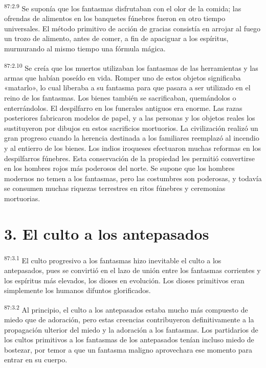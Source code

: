 \par
\textsuperscript{87:2.9} Se suponía que los fantasmas disfrutaban con el olor de la comida; las ofrendas de alimentos en los banquetes fúnebres fueron en otro tiempo universales. El método primitivo de acción de gracias consistía en arrojar al fuego un trozo de alimento, antes de comer, a fin de apaciguar a los espíritus, murmurando al mismo tiempo una fórmula mágica.

\par
\textsuperscript{87:2.10} Se creía que los muertos utilizaban los fantasmas de las herramientas y las armas que habían poseído en vida. Romper uno de estos objetos significaba «matarlo», lo cual liberaba a su fantasma para que pasara a ser utilizado en el reino de los fantasmas. Los bienes también se sacrificaban, quemándolos o enterrándolos. El despilfarro en los funerales antiguos era enorme. Las razas posteriores fabricaron modelos de papel, y a las personas y los objetos reales los sustituyeron por dibujos en estos sacrificios mortuorios. La civilización realizó un gran progreso cuando la herencia destinada a los familiares reemplazó al incendio y al entierro de los bienes. Los indios iroqueses efectuaron muchas reformas en los despilfarros fúnebres. Esta conservación de la propiedad les permitió convertirse en los hombres rojos más poderosos del norte. Se supone que los hombres modernos no temen a los fantasmas, pero las costumbres son poderosas, y todavía se consumen muchas riquezas terrestres en ritos fúnebres y ceremonias mortuorias.

\section*{3. El culto a los antepasados}
\par
\textsuperscript{87:3.1} El culto progresivo a los fantasmas hizo inevitable el culto a los antepasados, pues se convirtió en el lazo de unión entre los fantasmas corrientes y los espíritus más elevados, los dioses en evolución. Los dioses primitivos eran simplemente los humanos difuntos glorificados.

\par
\textsuperscript{87:3.2} Al principio, el culto a los antepasados estaba mucho más compuesto de miedo que de adoración, pero estas creencias contribuyeron definitivamente a la propagación ulterior del miedo y la adoración a los fantasmas. Los partidarios de los cultos primitivos a los fantasmas de los antepasados tenían incluso miedo de bostezar, por temor a que un fantasma maligno aprovechara ese momento para entrar en su cuerpo.

